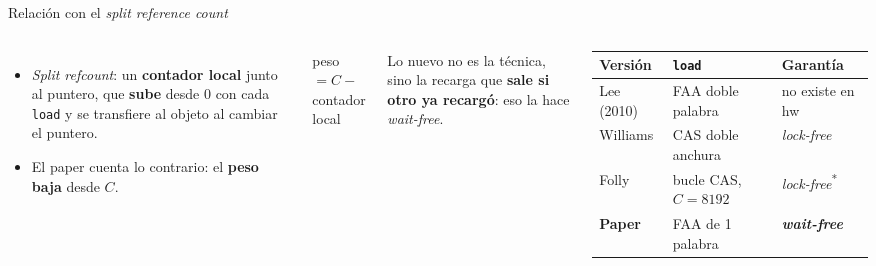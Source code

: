 \documentclass[aspectratio=169,11pt]{beamer}
\newcommand{\clave}[1]{\textcolor{acento}{\textbf{#1}}}
\begin{document}
\begin{frame}{Relación con el \emph{split reference count}}
  \begin{columns}[T]
    \begin{itemize}\small
      \item \emph{Split refcount}: un \textbf{contador local} junto al puntero, que \textbf{sube} desde 0 con cada \texttt{load} y se transfiere al objeto al cambiar el puntero.
      \item El paper cuenta lo contrario: el \textbf{peso baja} desde $C$.
    \end{itemize}
    \begin{block}{}\centering peso $= C -$ contador local\end{block}
    \small Lo nuevo no es la técnica, sino la recarga que \clave{sale si otro ya recargó}: eso la hace \emph{wait-free}.
    \renewcommand{\arraystretch}{1.1}\footnotesize
    \begin{tabular}{@{}lll@{}}
      \toprule
      Versión & \texttt{load} & Garantía\\
      \midrule
      Lee (2010) & FAA doble palabra & no existe en hw\\
      Williams & CAS doble anchura & \emph{lock-free}\\
      Folly & bucle CAS, $C = 8192$ & \emph{lock-free}\textsuperscript{*}\\
      \textbf{Paper} & FAA de 1 palabra & \textbf{\emph{wait-free}}\\
      \bottomrule
    \end{tabular}
    \par{}
  \end{columns}
\end{frame}
\end{document}
